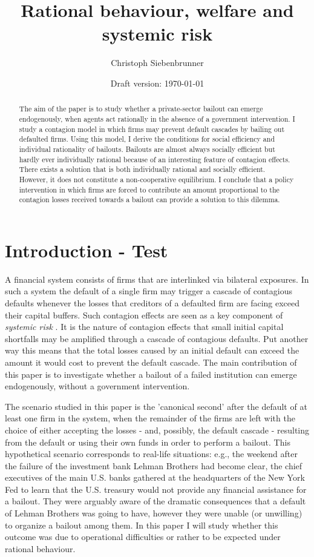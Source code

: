 \documentclass[12pt,a4paper]{article}
\date{Draft version: \today}
\title{Rational behaviour, welfare and systemic risk}
\author{Christoph Siebenbrunner}
\begin{document}
\maketitle

\begin{abstract}
The aim of the paper is to study whether a private-sector bailout can emerge endogenously, when agents act rationally in the absence of a government intervention. I study a contagion model in which firms may prevent default cascades by bailing out defaulted firms. Using this model, I derive the conditions for social efficiency and individual rationality of bailouts. Bailouts are almost always socially efficient but hardly ever individually rational because of an interesting feature of contagion effects. There exists a solution that is both individually rational and socially efficient. However, it does not constitute a non-cooperative equilibrium. I conclude that a policy intervention in which firms are forced to contribute an amount proportional to the contagion losses received towards a bailout can provide a solution to this dilemma.
\end{abstract}

\section{Introduction - Test}
A financial system consists of firms that are interlinked via bilateral exposures. In such a system the default of a single firm may trigger a cascade of contagious defaults whenever the losses that creditors of a defaulted firm are facing exceed their capital buffers. Such contagion effects are seen as a key component of \textit{systemic risk} \cite[pp. 134-142]{ECB09}. It is the nature of contagion effects that small initial capital shortfalls may be amplified through a cascade of contagious defaults. Put another way this means that the total losses caused by an initial default can exceed the amount it would cost to prevent the default cascade. The main contribution of this paper is to investigate whether a bailout of a failed institution can emerge endogenously, without a government intervention.

The scenario studied in this paper is the 'canonical second' after the default of at least one firm in the system, when the remainder of the firms are left with the choice of either accepting the losses - and, possibly, the default cascade - resulting from the default or using their own funds in order to perform a bailout. This hypothetical scenario corresponds to real-life situations: e.g., the weekend after the failure of the investment bank Lehman Brothers had become clear, the chief executives of the main U.S. banks gathered at the headquarters of the New York Fed to learn that the U.S. treasury would not provide any financial assistance for a bailout. They were arguably aware of the dramatic consequences that a default of Lehman Brothers was going to have, however they were unable (or unwilling) to organize a bailout among them. In this paper I will study whether this outcome was due to operational difficulties or rather to be expected under rational behaviour.
\end{document}
